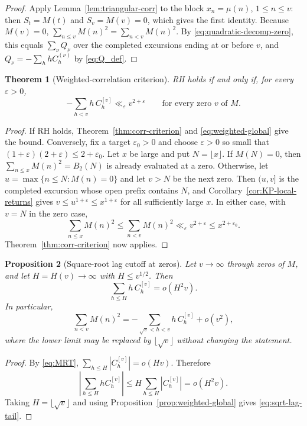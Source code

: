 \documentclass[11pt]{amsart}
\numberwithin{equation}{section}
\theoremstyle{plain}
\newtheorem{theorem}{Theorem}[section]
\newtheorem{proposition}[theorem]{Proposition}
\theoremstyle{definition}
\theoremstyle{remark}
\newcommand{\eps}{\varepsilon}
\begin{document}
\begin{proof}
Apply Lemma~\ref{lem:triangular-corr} to the block $x_n=\mu(n)$,
$1\le n\le v$: then $S_t=M(t)$ and $S_v=M(v)=0$, which gives the first
identity. Because $M(v)=0$, $\sum_{n\le v}M(n)^2=\sum_{n<v}M(n)^2$.  By
\eqref{eq:quadratic-decomp-zero}, this equals $\sum_\nu Q_\nu$ over the completed excursions ending at or before $v$, and
$Q_\nu=-\sum_hhC^{(\nu)}_h$ by \eqref{eq:Q_def}.
\end{proof}

\begin{theorem}[Weighted-correlation criterion]
\label{thm:weighted-corr-RH}
RH holds if and only if, for every $\eps>0$,
\[
-\sum_{h<v}h\,C^{[v]}_h\ll_\eps v^{2+\eps}
\qquad\text{for every zero $v$ of $M$.}
\]
\end{theorem}

\begin{proof}
If RH holds, Theorem~\ref{thm:corr-criterion} and
\eqref{eq:weighted-global} give the bound. Conversely, fix a target
$\eps_0>0$ and choose $\eps>0$ so small that
$(1+\eps)(2+\eps)\le2+\eps_0$. Let $x$ be large and put $N=\lfloor x\rfloor$.  If $M(N)=0$, then
$\sum_{n\le x}M(n)^2=B_2(N)$ is already evaluated at a zero.  Otherwise,
let $u=\max\{n\le N:M(n)=0\}$ and let $v> N$ be the next zero.  Then
$(u,v]$ is the completed excursion whose open prefix contains $N$, and
Corollary~\ref{cor:KP-local-returns} gives
$v\le u^{1+\eps}\le x^{1+\eps}$ for all sufficiently large $x$.  In
either case, with $v=N$ in the zero case,
\[
\sum_{n\le x}M(n)^2\le\sum_{n<v}M(n)^2
\ll_\eps v^{2+\eps}\le x^{2+\eps_0}.
\]
Theorem~\ref{thm:corr-criterion} now applies.
\end{proof}

\begin{proposition}[Square-root lag cutoff at zeros]
\label{prop:sqrt-lag-cutoff}
Let $v\to\infty$ through zeros of $M$, and let $H=H(v)\to\infty$ with
$H\le v^{1/2}$. Then
\begin{equation}
\label{eq:small-lag-weighted}
\sum_{h\le H}h\,C_h^{[v]}=o(H^2v).
\end{equation}
In particular,
\begin{equation}
\label{eq:sqrt-lag-tail}
\sum_{n<v}M(n)^2
=-\sum_{\sqrt v<h<v}h\,C_h^{[v]}+o(v^2),
\end{equation}
where the lower limit may be replaced by $\lfloor\sqrt v\rfloor$ without
changing the statement.
\end{proposition}

\begin{proof}
By \eqref{eq:MRT},
$\sum_{h\le H}|C_h^{[v]}|=o(Hv)$. Therefore
\[
\left|\sum_{h\le H}hC_h^{[v]}\right|
\le H\sum_{h\le H}|C_h^{[v]}|=o(H^2v).
\]
Taking $H=\lfloor\sqrt v\rfloor$ and using
Proposition~\ref{prop:weighted-global} gives \eqref{eq:sqrt-lag-tail}.
\end{proof}
\end{document}
